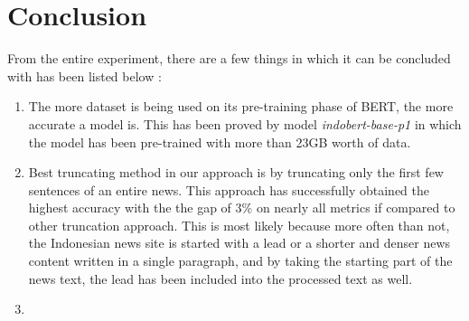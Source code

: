 \section{Conclusion}
\label{sec:conclusion}

From the entire experiment, there are a few things in which it can be concluded with has been listed below :

\begin{enumerate}
    \item The more dataset is being used on its pre-training phase of BERT, the more accurate a model is. This has been proved by model \textit{indobert-base-p1} in which the model has been pre-trained with more than 23GB worth of data.

    \item Best truncating method in our approach is by truncating only the first few sentences of an entire news. This approach has successfully obtained the highest accuracy with the the gap of 3\% on nearly all metrics if compared to other truncation approach. This is most likely because more often than not, the Indonesian news site is started with a lead or a shorter and denser news content written in a single paragraph, and by taking the starting part of the news text, the lead has been included into the processed text as well.

    \item
\end{enumerate}

\lipsum[21-23]
